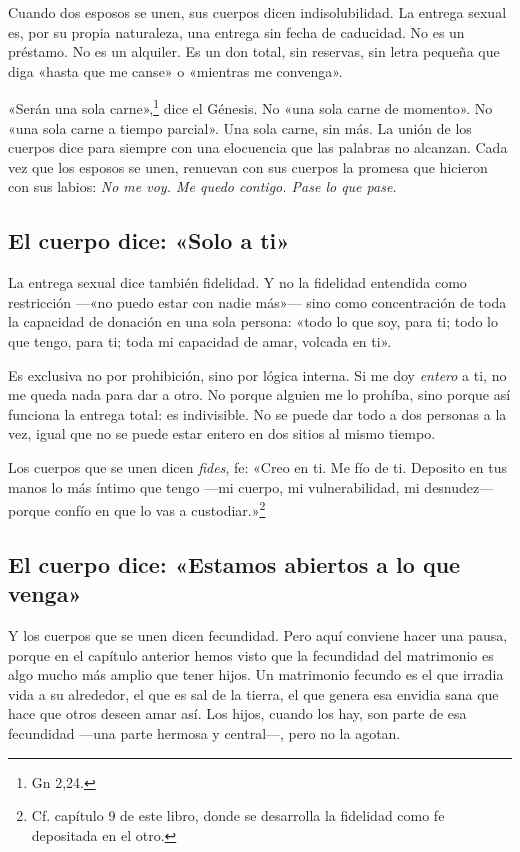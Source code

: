 Cuando dos esposos se unen, sus cuerpos dicen indisolubilidad. La entrega sexual es, por su propia naturaleza, una entrega sin fecha de caducidad. No es un préstamo. No es un alquiler. Es un don total, sin reservas, sin letra pequeña que diga «hasta que me canse» o «mientras me convenga».

«Serán una sola carne»,\footnote{Gn 2,24.} dice el Génesis. No «una sola carne de momento». No «una sola carne a tiempo parcial». Una sola carne, sin más. La unión de los cuerpos dice para siempre con una elocuencia que las palabras no alcanzan. Cada vez que los esposos se unen, renuevan con sus cuerpos la promesa que hicieron con sus labios: \emph{No me voy. Me quedo contigo. Pase lo que pase.}

\subsection*{El cuerpo dice: «Solo a ti»}

La entrega sexual dice también fidelidad. Y no la fidelidad entendida como restricción ---«no puedo estar con nadie más»--- sino como concentración de toda la capacidad de donación en una sola persona: «todo lo que soy, para ti; todo lo que tengo, para ti; toda mi capacidad de amar, volcada en ti».

Es exclusiva no por prohibición, sino por lógica interna. Si me doy \emph{entero} a ti, no me queda nada para dar a otro. No porque alguien me lo prohíba, sino porque así funciona la entrega total: es indivisible. No se puede dar todo a dos personas a la vez, igual que no se puede estar entero en dos sitios al mismo tiempo.

Los cuerpos que se unen dicen \textit{fides}, fe: «Creo en ti. Me fío de ti. Deposito en tus manos lo más íntimo que tengo ---mi cuerpo, mi vulnerabilidad, mi desnudez--- porque confío en que lo vas a custodiar.»\footnote{Cf. capítulo 9 de este libro, donde se desarrolla la fidelidad como fe depositada en el otro.}

\subsection*{El cuerpo dice: «Estamos abiertos a lo que venga»}

Y los cuerpos que se unen dicen fecundidad. Pero aquí conviene hacer una pausa, porque en el capítulo anterior hemos visto que la fecundidad del matrimonio es algo mucho más amplio que tener hijos. Un matrimonio fecundo es el que irradia vida a su alrededor, el que es sal de la tierra, el que genera esa envidia sana que hace que otros deseen amar así. Los hijos, cuando los hay, son parte de esa fecundidad ---una parte hermosa y central---, pero no la agotan.

